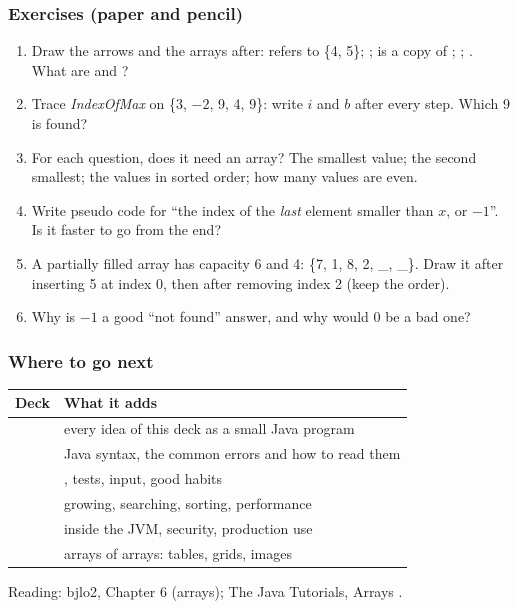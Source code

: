 \documentclass[aspectratio=169,10pt,compress]{beamer}
\begin{document}
\begin{frame}[t,fragile] \frametitle{Exercises (paper and pencil)}
	\begin{enumerate}\small
		\item Draw the arrows and the arrays after:
		       refers to \{4, 5\}; ;  is a copy of ;
		      ; . What are  and ?
		\item Trace \emph{IndexOfMax} on \{3, $-2$, 9, 4, 9\}: write $i$ and $b$ after every step.
		      Which 9 is found?
		\item For each question, does it need an array? The smallest value; the second smallest;
		      the values in sorted order; how many values are even.
		\item Write pseudo code for ``the index of the \emph{last} element smaller than $x$, or $-1$''.
		      Is it faster to go from the end?
		\item A partially filled array has capacity 6 and  4: \{7, 1, 8, 2, \_, \_\}.
		      Draw it after inserting 5 at index 0, then after removing index 2 (keep the order).
		\item Why is $-1$ a good ``not found'' answer, and why would $0$ be a bad one?
	\end{enumerate}
\end{frame}




\begin{frame}[t,fragile] \frametitle{Where to go next}


\begin{table}
		\small
		\begin{tabular}{@{}L{0.30\textwidth}L{0.62\textwidth}@{}}
			\toprule
			\textbf{Deck} & \textbf{What it adds} \\
			\midrule
			  & every idea of this deck as a small Java program \\
			  & Java syntax, the common errors and how to read them \\
			 & , tests, input, good habits \\
			    & growing, searching, sorting, performance \\
			    & inside the JVM, security, production use \\
			             & arrays of arrays: tables, grids, images \\
			\bottomrule
		\end{tabular}
\end{table}%


	\vspace{0.5em}
	\small Reading: bjlo2, Chapter 6 (arrays); The Java Tutorials, Arrays \cite{TheJavaTutorialsArray}.
\end{frame}
\end{document}
